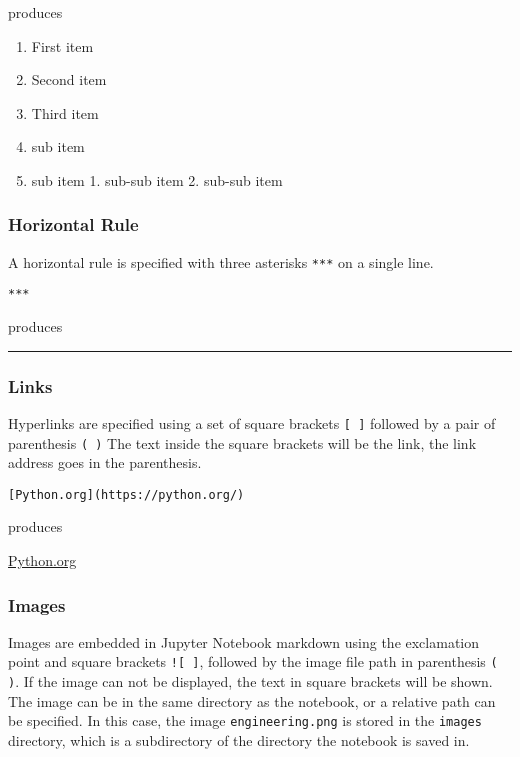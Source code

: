 \documentclass{book}
\providecommand{\tightlist}{%
      \setlength{\itemsep}{0pt}\setlength{\parskip}{0pt}}
\newcommand{\passthrough}[1]{#1}
\begin{document}
produces

\begin{enumerate}
\def\labelenumi{\arabic{enumi}.}
\tightlist
\item
  First item
\item
  Second item
\item
  Third item
\item
  sub item
\item
  sub item 1. sub-sub item 2. sub-sub item
\end{enumerate}

\hypertarget{horizontal-rule}{%
\subsubsection{Horizontal Rule}\label{horizontal-rule}}

A horizontal rule is specified with three asterisks
\passthrough{\lstinline!***!} on a single line.

\begin{lstlisting}
***
\end{lstlisting}

produces

\begin{center}\rule{0.5\linewidth}{\linethickness}\end{center}

\hypertarget{links}{%
\subsubsection{Links}\label{links}}

Hyperlinks are specified using a set of square brackets
\passthrough{\lstinline![ ]!} followed by a pair of parenthesis
\passthrough{\lstinline!( )!} The text inside the square brackets will
be the link, the link address goes in the parenthesis.

\begin{lstlisting}
[Python.org](https://python.org/)
\end{lstlisting}

produces

\href{https://python.org}{Python.org}

\hypertarget{images}{%
\subsubsection{Images}\label{images}}

Images are embedded in Jupyter Notebook markdown using the exclamation
point and square brackets \passthrough{\lstinline"![ ]"}, followed by
the image file path in parenthesis \passthrough{\lstinline!( )!}. If the
image can not be displayed, the text in square brackets will be shown.
The image can be in the same directory as the notebook, or a relative
path can be specified. In this case, the image
\passthrough{\lstinline!engineering.png!} is stored in the
\passthrough{\lstinline!images!} directory, which is a subdirectory of
the directory the notebook is saved in.
\end{document}
